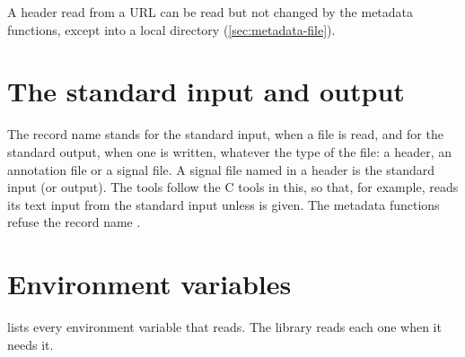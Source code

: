 A header read from a URL can be read but not changed by the metadata
functions, except into a local directory (\cref{sec:metadata-file}).

\section{The standard input and output}
\label{sec:stdio}

The record name \code{-} stands for the standard input, when a file is read,
and for the standard output, when one is written, whatever the type of the
file: a header, an annotation file or a signal file. A signal file named
\code{-} in a header is the standard input (or output). The tools follow the
C tools in this, so that, for example,  reads its text input from
the standard input unless  is given. The metadata functions refuse
the record name \code{-}.

\section{Environment variables}
\label{sec:environment}

 lists every environment variable that \wfdbx{} reads.
The library reads each one when it needs it.

